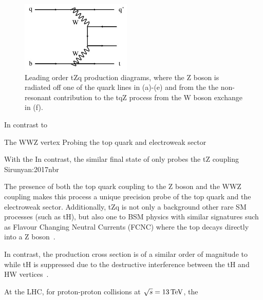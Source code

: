 \begin{figure}[p]
\includegraphics[width=0.47\textwidth]{figs/top-physics/tZq_feyn6.jpg}
\caption{Leading order tZq production diagrams, where the Z boson is radiated off one of the quark lines in (a)-(e) and from the the non-resonant contribution to the tqZ process from the W boson exchange in (f).}
\label{fig:feyn_tZq}
\end{figure}

In contrast to \ttZ

The WWZ vertex 
Probing the top quark and electroweak sector 

With the 
In contrast, the similar final state of \ttZ only probes the tZ coupling
Sirunyan:2017nbr

The presence of both the top quark coupling to the Z boson and the WWZ coupling makes this process a unique precision probe of the top quark and the electroweak sector.
Additionally, tZq is not only a background other rare SM processes (such as tH), but also one to BSM physics with similar signatures such as Flavour Changing Neutral Currents (FCNC) where the top decays directly into a Z boson~\cite{AguilarSaavedra:2004wm}.	

In contrast, the \ttH production cross section is of a similar order of magnitude to \ttZ while tH is  suppressed due to the destructive interference between the tH and HW vertices~\cite{Maltoni:2001hu}.




At the LHC, for proton-proton collisions at $\sqrt{s} = 13 \,\text{Te\hspace{-.08em}V}$, the 

%
%
%

